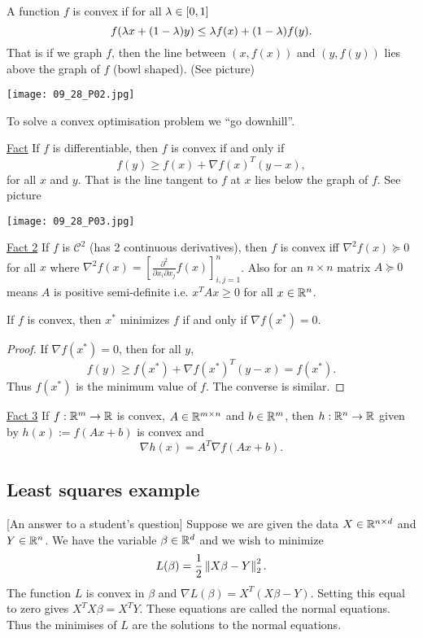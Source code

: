\begin{defn}
    A function $f$ is convex if for all $\lambda \in [0,1]$
    \[f(\lambda x + (1-\lambda)y) \le \lambda f(x)+(1-\lambda)f(y). \]
    That is if we graph $f$, then the line between $(x,f(x))$ and $(y,f(y))$ lies above the graph of $f$ (bowl shaped). (See picture)
\end{defn}

\begin{center}
    \texttt{[image: 09\_28\_P02.jpg]}
\end{center}
To solve a convex optimisation problem we ``go downhill''. 

\underline{Fact} If $f$ is differentiable, then $f$ is convex if and only if 
\[f(y)\ge f(x) + \nabla f(x)^T(y-x),\]
for all $x$ and $y$. That is the line tangent to $f$ at $x$ lies below the graph of $f$. See picture

\begin{center}
    \texttt{[image: 09\_28\_P03.jpg]}
\end{center}

\underline{Fact 2} If $f$ is $\mathcal{C}^2$ (has 2 continuous derivatives), then $f$ is convex iff $\nabla^2 f(x) \succeq 0$ for all $x$ where $\nabla^2 f(x) = \left[\frac{\partial^2}{\partial x_i \partial x_j}f(x)\right]_{i,j=1}^n$. Also for an $n \times n$ matrix $A \succeq 0$ means $A$ is positive semi-definite i.e. $x^TAx \ge 0$ for all $x \in {\mathbb R}^n$.

\begin{prop}
If $f$ is convex, then $x^*$ minimizes $f$ if and only if $\nabla f(x^*) = 0$.
\end{prop}
\begin{proof}
    If $\nabla f(x^*) = 0$, then for all $y$,
    \[f(y) \ge f(x^*) + \nabla f(x^*)^T(y-x) = f(x^*). \]
    Thus $f(x^*)$ is the minimum value of $f$. The converse is similar.
\end{proof}
\underline{Fact 3} If $f: {\mathbb R}^m \to {\mathbb R}$ is convex, $A \in {\mathbb R}^{m \times n}$ and $b \in {\mathbb R}^m$, then $h: {\mathbb R}^n \to {\mathbb R}$ given by $h(x) := f(Ax+b)$ is convex and 
\[\nabla h(x) = A^T \nabla f(Ax+b). \]
\subsection{Least squares example}
[An answer to a student's question] Suppose we are given the data $X \in {\mathbb R}^{n \times d}$ and $Y \in {\mathbb R}^n$. We have the variable $\beta \in {\mathbb R}^d$ and we wish to minimize
\[L(\beta) = \frac{1}{2}\left\|X\beta-Y\right\|_2^2. \]
The function $L$ is convex in $\beta$ and $\nabla L(\beta) = X^T(X\beta - Y)$. Setting this equal to zero gives $X^TX\beta = X^TY$. These equations are called the normal equations. Thus the minimises of $L$ are the solutions to the normal equations.

